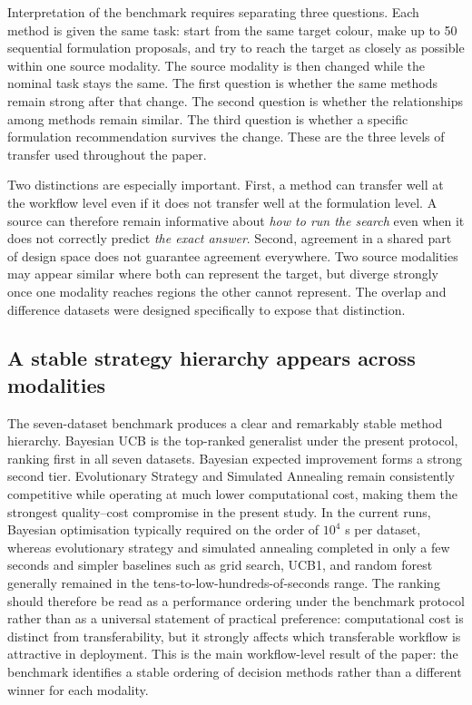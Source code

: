 \documentclass[twoside,twocolumn,9pt]{article}
\begin{document}
Interpretation of the benchmark requires separating three questions. Each method is given the same task: start from the same target colour, make up to 50 sequential formulation proposals, and try to reach the target as closely as possible within one source modality. The source modality is then changed while the nominal task stays the same. The first question is whether the same methods remain strong after that change. The second question is whether the relationships among methods remain similar. The third question is whether a specific formulation recommendation survives the change. These are the three levels of transfer used throughout the paper.

Two distinctions are especially important. First, a method can transfer well at the workflow level even if it does not transfer well at the formulation level. A source can therefore remain informative about \emph{how to run the search} even when it does not correctly predict \emph{the exact answer}. Second, agreement in a shared part of design space does not guarantee agreement everywhere. Two source modalities may appear similar where both can represent the target, but diverge strongly once one modality reaches regions the other cannot represent. The overlap and difference datasets were designed specifically to expose that distinction.

\subsection{A stable strategy hierarchy appears across modalities}

The seven-dataset benchmark produces a clear and remarkably stable method hierarchy. Bayesian UCB is the top-ranked generalist under the present protocol, ranking first in all seven datasets. Bayesian expected improvement forms a strong second tier. Evolutionary Strategy and Simulated Annealing remain consistently competitive while operating at much lower computational cost, making them the strongest quality--cost compromise in the present study. In the current runs, Bayesian optimisation typically required on the order of $10^4$ s per dataset, whereas evolutionary strategy and simulated annealing completed in only a few seconds and simpler baselines such as grid search, UCB1, and random forest generally remained in the tens-to-low-hundreds-of-seconds range. The ranking should therefore be read as a performance ordering under the benchmark protocol rather than as a universal statement of practical preference: computational cost is distinct from transferability, but it strongly affects which transferable workflow is attractive in deployment. This is the main workflow-level result of the paper: the benchmark identifies a stable ordering of decision methods rather than a different winner for each modality.
\end{document}
